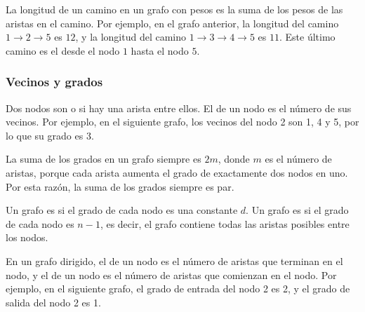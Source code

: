 La longitud de un camino en un grafo con pesos
es la suma de los pesos de las aristas en el camino.
Por ejemplo, en el grafo anterior,
la longitud del camino
$1 \rightarrow 2 \rightarrow 5$ es $12$,
y la longitud del camino
$1 \rightarrow 3 \rightarrow 4 \rightarrow 5$ es $11$.
Este último camino es el  desde
el nodo $1$ hasta el nodo $5$.

\subsubsection{Vecinos y grados}


Dos nodos son  o 
si hay una arista entre ellos.
El  de un nodo
es el número de sus vecinos.
Por ejemplo, en el siguiente grafo,
los vecinos del nodo 2 son 1, 4 y 5,
por lo que su grado es 3.

\begin{center}
\end{center}

La suma de los grados en un grafo siempre es $2m$,
donde $m$ es el número de aristas,
porque cada arista
aumenta el grado de exactamente dos nodos en uno.
Por esta razón, la suma de los grados siempre es par.


Un grafo es  si el
grado de cada nodo es una constante $d$.
Un grafo es  si el
grado de cada nodo es $n-1$, es decir,
el grafo contiene todas las aristas posibles
entre los nodos.

En un grafo dirigido, el 
de un nodo es el número de aristas
que terminan en el nodo,
y el  de un nodo
es el número de aristas que comienzan en el nodo.
Por ejemplo, en el siguiente grafo,
el grado de entrada del nodo 2 es 2,
y el grado de salida del nodo 2 es 1.

